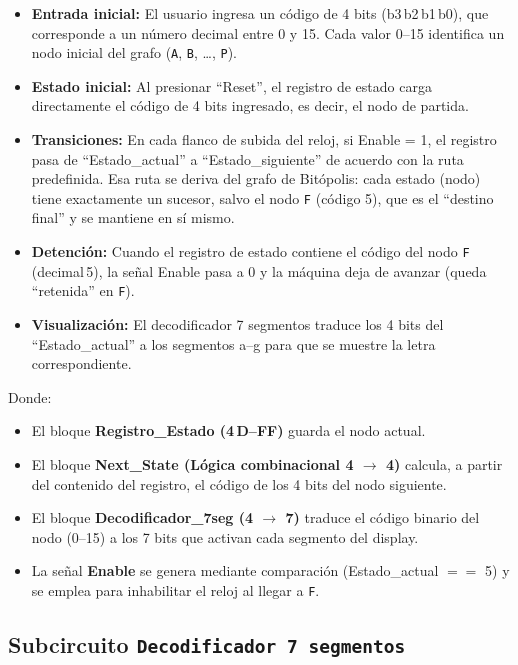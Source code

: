 \documentclass[12pt]{article}
\begin{document}
\begin{itemize}
  \item \textbf{Entrada inicial:} El usuario ingresa un código de 4 bits (b3\,b2\,b1\,b0), que corresponde a un número decimal entre 0 y 15. Cada valor 0–15 identifica un nodo inicial del grafo (\texttt{A}, \texttt{B}, …, \texttt{P}).
  \item \textbf{Estado inicial:} Al presionar “Reset”, el registro de estado carga directamente el código de 4 bits ingresado, es decir, el nodo de partida.
  \item \textbf{Transiciones:} En cada flanco de subida del reloj, si Enable = 1, el registro pasa de “Estado\_actual” a “Estado\_siguiente” de acuerdo con la ruta predefinida. Esa ruta se deriva del grafo de Bitópolis: cada estado (nodo) tiene exactamente un sucesor, salvo el nodo \texttt{F} (código 5), que es el “destino final” y se mantiene en sí mismo.
  \item \textbf{Detención:} Cuando el registro de estado contiene el código del nodo \texttt{F} (decimal\,5), la señal Enable pasa a 0 y la máquina deja de avanzar (queda “retenida” en \texttt{F}).
  \item \textbf{Visualización:} El decodificador 7 segmentos traduce los 4 bits del “Estado\_actual” a los segmentos a–g para que se muestre la letra correspondiente.  
\end{itemize}


\begin{center}
\end{center}

Donde:
\begin{itemize}
  \item El bloque \textbf{Registro\_Estado (4\,D–FF)} guarda el nodo actual.  
  \item El bloque \textbf{Next\_State (Lógica combinacional 4 $\to$ 4)} calcula, a partir del contenido del registro, el código de los 4 bits del nodo siguiente.  
  \item El bloque \textbf{Decodificador\_7seg (4 $\to$ 7)} traduce el código binario del nodo (0–15) a los 7 bits que activan cada segmento del display.  
  \item La señal \textbf{Enable} se genera mediante comparación (Estado\_actual $==$ 5) y se emplea para inhabilitar el reloj al llegar a \texttt{F}.  
\end{itemize}

\newpage

\subsection*{Subcircuito \texttt{Decodificador 7 segmentos}}
\end{document}

